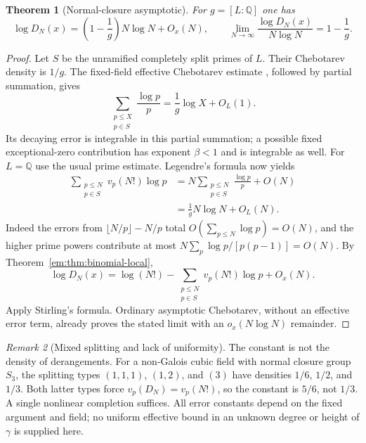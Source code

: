 \documentclass[11pt,a4paper]{article}
\newcommand{\Q}{\mathbb Q}
\newtheorem{theorem}{Theorem}[section]
\theoremstyle{definition}
\theoremstyle{remark}
\newtheorem{remark}[theorem]{Remark}
\theoremstyle{plain}
\numberwithin{equation}{section}
\begin{document}
\begin{theorem}[Normal-closure asymptotic]
\label{em:thm:binomial-density}
For $g=[L:\Q]$ one has
\[
 \log D_N(x)=\left(1-\frac1g\right)N\log N+O_x(N),
 \qquad
 \lim_{N\to\infty}\frac{\log D_N(x)}{N\log N}=1-\frac1g.
\]
\end{theorem}
\begin{proof}
Let $S$ be the unramified completely split primes of $L$.  Their
Chebotarev density is $1/g$.  The fixed-field effective Chebotarev
estimate \cite[Theorem 1.1]{TZ}, followed by partial summation, gives
\[
 \sum_{\substack{p\le X\\p\in S}}\frac{\log p}{p}
      =\frac1g\log X+O_L(1).
\]
Its decaying error is integrable in this partial summation; a possible
fixed exceptional-zero contribution has exponent $\beta<1$ and is
integrable as well.  For $L=\Q$ use the usual prime estimate.
Legendre's formula now yields
\begin{align*}
 \sum_{\substack{p\le N\\p\in S}}v_p(N!)\log p
 &=N\sum_{\substack{p\le N\\p\in S}}\frac{\log p}{p}+O(N)\\
 &=\frac1gN\log N+O_L(N).
\end{align*}
Indeed the errors from $\lfloor N/p\rfloor-N/p$ total
$O(\sum_{p\le N}\log p)=O(N)$, and the higher prime powers contribute
at most $N\sum_p\log p/[p(p-1)]=O(N)$.  By
Theorem~\ref{em:thm:binomial-local},
\[
 \log D_N(x)=\log(N!)
       -\sum_{\substack{p\le N\\p\in S}}v_p(N!)\log p+O_x(N).
\]
Apply Stirling's formula.  Ordinary asymptotic Chebotarev, without an
effective error term, already proves the stated limit with an
$o_x(N\log N)$ remainder.
\end{proof}

\begin{remark}[Mixed splitting and lack of uniformity]
The constant is not the density of derangements.  For a non-Galois
cubic field with normal closure group $S_3$, the splitting types
$(1,1,1)$, $(1,2)$, and $(3)$ have densities $1/6$, $1/2$, and $1/3$.
Both latter types force $v_p(D_N)=v_p(N!)$, so the constant is $5/6$,
not $1/3$.  A single nonlinear completion suffices.  All error constants
depend on the fixed argument and field; no uniform effective bound in
an unknown degree or height of $\gamma$ is supplied here.
\end{remark}
\end{document}
